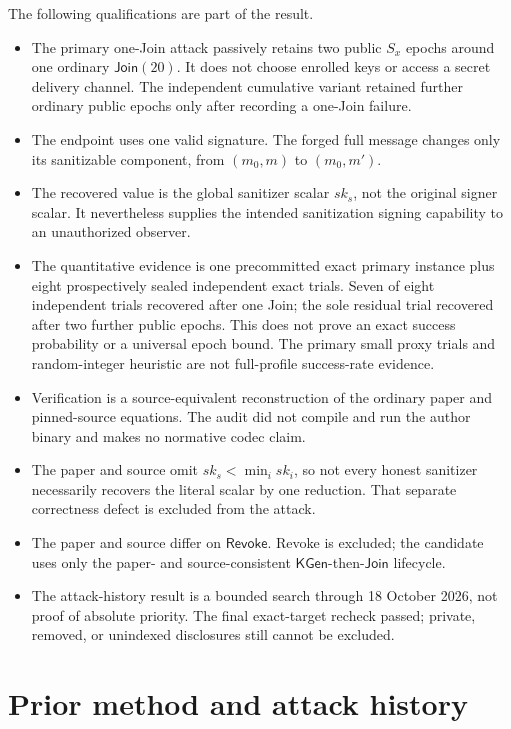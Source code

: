 \documentclass[10pt,a4paper]{article}
\newcommand{\KeyGen}{\mathsf{KGen}}
\newcommand{\DJoin}{\mathsf{Join}}
\begin{document}
The following qualifications are part of the result.
\begin{itemize}
  \item The primary one-Join attack passively retains two public \(S_x\)
        epochs around one ordinary \(\DJoin(20)\). It does not choose enrolled
        keys or access a secret delivery channel. The independent cumulative
        variant retained further ordinary public epochs only after recording a
        one-Join failure.
  \item The endpoint uses one valid signature. The forged full message changes
        only its sanitizable component, from \((m_0,m)\) to \((m_0,m')\).
  \item The recovered value is the global sanitizer scalar \(sk_s\), not the
        original signer scalar. It nevertheless supplies the intended
        sanitization signing capability to an unauthorized observer.
  \item The quantitative evidence is one precommitted exact primary instance
        plus eight prospectively sealed independent exact trials. Seven of
        eight independent trials recovered after one Join; the sole residual
        trial recovered after two further public epochs. This does not prove an
        exact success probability or a universal epoch bound. The primary
        small proxy trials and random-integer heuristic are not full-profile
        success-rate evidence.
  \item Verification is a source-equivalent reconstruction of the ordinary
        paper and pinned-source equations. The audit did not compile and run
        the author binary and makes no normative codec claim.
  \item The paper and source omit \(sk_s<\min_i sk_i\), so not every honest
        sanitizer necessarily recovers the literal scalar by one reduction.
        That separate correctness defect is excluded from the attack.
  \item The paper and source differ on \(\mathsf{Revoke}\). Revoke is excluded;
        the candidate uses only the paper- and source-consistent
        \(\KeyGen\)-then-\(\DJoin\) lifecycle.
  \item The attack-history result is a bounded search through 18 October 2026,
        not proof of absolute priority. The final exact-target recheck passed;
        private, removed, or unindexed disclosures still cannot be excluded.
\end{itemize}

\section{Prior method and attack history}
\end{document}
